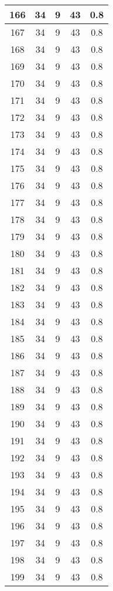 \documentclass[letterpaper, 12pt]{article}
\begin{document}
\begin{longtable}{|c|c|c|c|c|}
\hline
166 & 34 & 9 & 43 & 0.8 \\
\hline
167 & 34 & 9 & 43 & 0.8 \\
\hline
168 & 34 & 9 & 43 & 0.8 \\
\hline
169 & 34 & 9 & 43 & 0.8 \\
\hline
170 & 34 & 9 & 43 & 0.8 \\
\hline
171 & 34 & 9 & 43 & 0.8 \\
\hline
172 & 34 & 9 & 43 & 0.8 \\
\hline
173 & 34 & 9 & 43 & 0.8 \\
\hline
174 & 34 & 9 & 43 & 0.8 \\
\hline
175 & 34 & 9 & 43 & 0.8 \\
\hline
176 & 34 & 9 & 43 & 0.8 \\
\hline
177 & 34 & 9 & 43 & 0.8 \\
\hline
178 & 34 & 9 & 43 & 0.8 \\
\hline
179 & 34 & 9 & 43 & 0.8 \\
\hline
180 & 34 & 9 & 43 & 0.8 \\
\hline
181 & 34 & 9 & 43 & 0.8 \\
\hline
182 & 34 & 9 & 43 & 0.8 \\
\hline
183 & 34 & 9 & 43 & 0.8 \\
\hline
184 & 34 & 9 & 43 & 0.8 \\
\hline
185 & 34 & 9 & 43 & 0.8 \\
\hline
186 & 34 & 9 & 43 & 0.8 \\
\hline
187 & 34 & 9 & 43 & 0.8 \\
\hline
188 & 34 & 9 & 43 & 0.8 \\
\hline
189 & 34 & 9 & 43 & 0.8 \\
\hline
190 & 34 & 9 & 43 & 0.8 \\
\hline
191 & 34 & 9 & 43 & 0.8 \\
\hline
192 & 34 & 9 & 43 & 0.8 \\
\hline
193 & 34 & 9 & 43 & 0.8 \\
\hline
194 & 34 & 9 & 43 & 0.8 \\
\hline
195 & 34 & 9 & 43 & 0.8 \\
\hline
196 & 34 & 9 & 43 & 0.8 \\
\hline
197 & 34 & 9 & 43 & 0.8 \\
\hline
198 & 34 & 9 & 43 & 0.8 \\
\hline
199 & 34 & 9 & 43 & 0.8 \\
\hline
\end{longtable}
\end{document}
